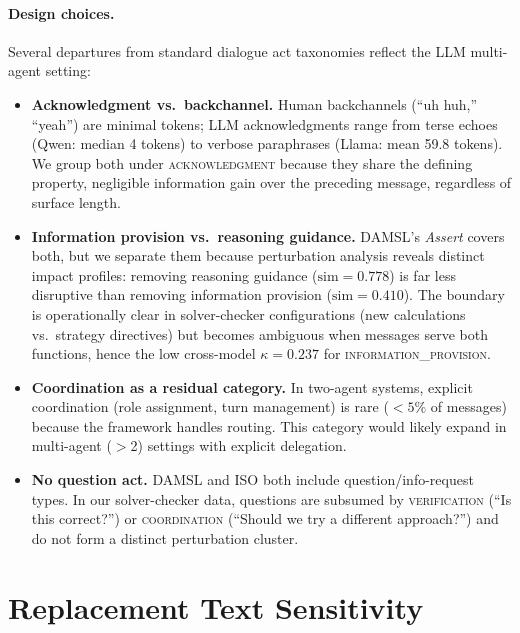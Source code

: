 \paragraph{Design choices.} Several departures from standard dialogue act taxonomies reflect the LLM multi-agent setting:

\begin{sloppypar}
\begin{itemize}[nosep, leftmargin=*]
    \item \textbf{Acknowledgment vs.\ backchannel.} Human backchannels (``uh huh,'' ``yeah'') are minimal tokens; LLM acknowledgments range from terse echoes (Qwen: median 4 tokens) to verbose paraphrases (Llama: mean 59.8 tokens). We group both under \textsc{acknowledgment} because they share the defining property, negligible information gain over the preceding message, regardless of surface length.
    \item \textbf{Information provision vs.\ reasoning guidance.} DAMSL's \textit{Assert} covers both, but we separate them because perturbation analysis reveals distinct impact profiles: removing reasoning guidance ($\text{sim} = 0.778$) is far less disruptive than removing information provision ($\text{sim} = 0.410$). The boundary is operationally clear in solver-checker configurations (new calculations vs.\ strategy directives) but becomes ambiguous when messages serve both functions, hence the low cross-model $\kappa = 0.237$ for \textsc{information\_provision}.
    \item \textbf{Coordination as a residual category.} In two-agent systems, explicit coordination (role assignment, turn management) is rare ($< 5\%$ of messages) because the framework handles routing. This category would likely expand in multi-agent ($>$2) settings with explicit delegation.
    \item \textbf{No question act.} DAMSL and ISO both include question/info-request types. In our solver-checker data, questions are subsumed by \textsc{verification} (``Is this correct?'') or \textsc{coordination} (``Should we try a different approach?'') and do not form a distinct perturbation cluster.
\end{itemize}
\end{sloppypar}

\section{Replacement Text Sensitivity}
\label{app:replacement-sensitivity}

